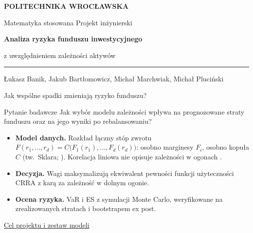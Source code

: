 \documentclass[aspectratio=169,11pt]{beamer}
\newcommand{\repo}{https://github.com/michalmarchwiak/bsc-project}
\newcommand{\rev}{9e941db56fde866672b262f5f6725268ce58feb7}
\newcommand{\src}[2]{\vfill{\scriptsize\color{Teal}%
  \href{\repo/blob/\rev/#1}{#2}}}
\newcommand{\zespol}{Łukasz Banik, Jakub Bartłomowicz, Michał Marchwiak, Michał Pluciński}
\begin{document}
\begin{frame}[plain]
  {\color{Teal}\textbf{POLITECHNIKA WROCŁAWSKA}}\par
  Matematyka stosowana \hfill Projekt inżynierski
  \vfill
  {\LARGE\bfseries
    Analiza ryzyka funduszu inwestycyjnego\par
    z uwzględnieniem zależności aktywów\par}
  \vspace{4mm}
  {\color{Teal}\rule{27mm}{1.2pt}}
  \vfill
  \zespol\par
\end{frame}

\begin{frame}{Jak wspólne spadki zmieniają ryzyko funduszu?}
  \begin{block}{Pytanie badawcze}
    Jak wybór modelu zależności wpływa na prognozowane straty
    funduszu oraz na jego wyniki po rebalansowaniu?
  \end{block}
  \begin{itemize}
    \item \textbf{Model danych.} Rozkład łączny stóp zwrotu
      \(F(r_1,\dots,r_d)=C\bigl(F_1(r_1),\dots,F_d(r_d)\bigr)\):
      osobno marginesy \(F_i\), osobno kopuła \(C\) (tw.\ Sklara;
      \citealp{sklar1959}). Korelacja liniowa nie opisuje
      zależności w ogonach \citep{embrechts2002}.
    \item \textbf{Decyzja.} Wagi maksymalizują ekwiwalent pewności
      funkcji użyteczności CRRA z karą za zależność w dolnym ogonie.
    \item \textbf{Ocena ryzyka.} VaR i ES z symulacji Monte Carlo,
      weryfikowane na zrealizowanych stratach i bootstrapem ex post.
  \end{itemize}
  \src{README.md}{Cel projektu i zestaw modeli}
\end{frame}
\end{document}
